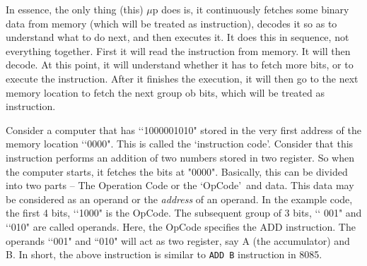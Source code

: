 \documentclass{book}
\begin{document}
In essence, the only thing (this) $\mu$p does is, it continuously fetches some
binary
data from memory (which will be treated as instruction), decodes it so as to
understand what to do next, and then executes
it. It does this in sequence, not everything together. First it will read the
instruction from memory. It will then decode. At this point, it will understand
whether it has to fetch more bits, or to execute the instruction. After it
finishes the execution,
it will then go to the next memory location to fetch the next group ob bits,
which will be treated as instruction.

Consider a computer that has \lq\lq1000001010" stored in the very first address
of
the memory location \lq\lq0000". This is called the \lq instruction code\rq.
Consider that this instruction performs an addition of two numbers stored in two
register. So when the computer starts, 
it fetches the bits at "0000".  Basically, this can be divided into
two parts -- The Operation Code or the \lq OpCode\rq\ and data. This data may be
considered
as an operand or the \emph{address} of an operand. In the example code, the
first 4 bits, \lq\lq 1000" is the OpCode. The subsequent group of 3 bits, \lq\lq
001"
and \lq\lq 010" are called operands. Here, the OpCode specifies the ADD
instruction. The operands \lq\lq001" and ``010" will act as two register, say 
A (the accumulator) and B. In short, the above instruction is similar to
\texttt{ADD B} instruction in 8085. 
\end{document}
